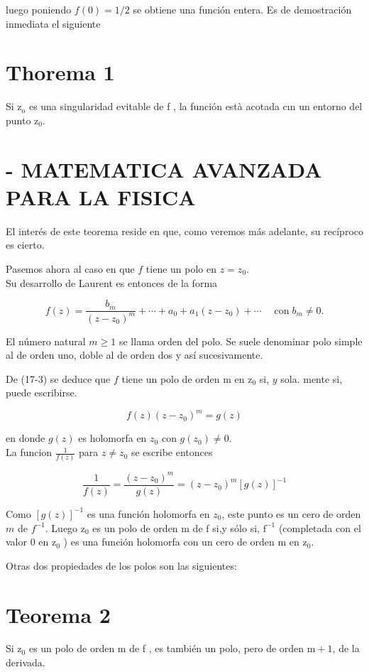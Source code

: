 \documentclass[10pt]{article}
\theoremstyle{plain}
\theoremstyle{definition}
\theoremstyle{remark}
\begin{document}
luego poniendo $f(0)=1 / 2$ se obtiene una función entera. Es de demostración inmediata el siguiente

\section*{Thorema 1}
Si $\mathrm{z}_{\mathrm{o}}$ es una singularidad evitable de f , la función està acotada cın un entorno del punto $\mathrm{z}_{0}$.

\section*{- MATEMATICA AVANZADA PARA LA FISICA}
El interés de este teorema reside en que, como veremos más adelante, su recíproco es cierto.

Pasemos ahora al caso en que $f$ tiene un polo en $z=z_{0}$.\\
Su desarrollo de Laurent es entonces de la forma

$$
f(z)=\frac{b_{m}}{\left(z-z_{0}\right)^{m}}+\cdots+a_{0}+a_{1}\left(z-z_{0}\right)+\cdots \quad \operatorname{con} b_{m} \neq 0 .
$$

El número natural $m \geqslant 1$ se llama orden del polo. Se suele denominar polo simple al de orden uno, doble al de orden dos y así sucesivamente.

De (17-3) se deduce que $f$ tiene un polo de orden m en $\mathrm{z}_{0}$ si, $y$ sola. mente si, puede escribirse.


\begin{equation*}
f(z)\left(z-z_{0}\right)^{m}=g(z) \tag{17-4}
\end{equation*}


en donde $g(z)$ es holomorfa en $z_{0}$ con $g\left(z_{0}\right) \neq 0$.\\
La funcion $\frac{1}{f(z)}$ para $z \neq z_{0}$ se escribe entonces

$$
\frac{1}{f(z)}=\frac{\left(z-z_{0}\right)^{m}}{g(z)}=\left(z-z_{0}\right)^{m}[g(z)]^{-1}
$$

Como $[g(z)]^{-1}$ es una función holomorfa en $z_{0}$, este punto es un cero de orden $m$ de $f^{-1}$. Luego $\mathrm{z}_{0}$ es un polo de orden m de f si,y sólo si, $\mathrm{f}^{-1}$ (completada con el valor 0 en $\mathrm{z}_{0}$ ) es una función holomorfa con un cero de orden m en $\mathrm{z}_{0}$.

Otras dos propiedades de los polos son las siguientes:

\section*{Teorema 2}
Si $\mathrm{z}_{0}$ es un polo de orden m de f , es también un polo, pero de orden $\mathrm{m}+1$, de la derivada.
\end{document}
